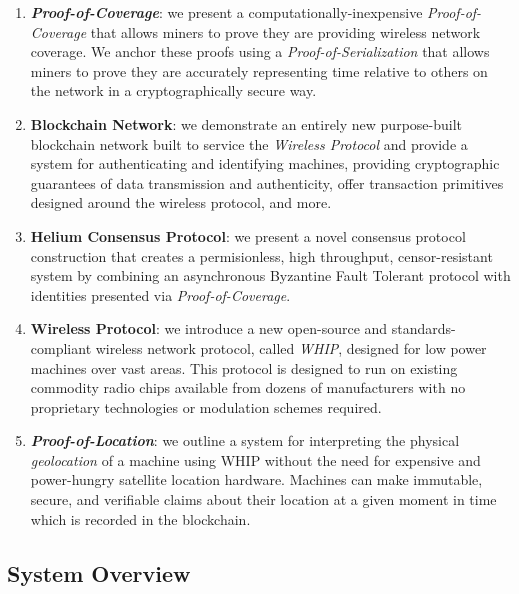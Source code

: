 \documentclass[10pt, nonatbib, nocopyrightspace, reprint]{sigplanconf}
\begin{document}
\begin{enumerate}
  \item \textbf{\emph{Proof-of-Coverage}}: we present a computationally-inexpensive \emph{Proof-of-Coverage} that allows miners to prove they are providing wireless network coverage. We anchor these proofs using a \emph{Proof-of-Serialization} that allows miners to prove they are accurately representing time relative to others on the network in a cryptographically secure way.

  \item \textbf{Blockchain Network}: we demonstrate an entirely new purpose-built blockchain network built to service the \emph{Wireless Protocol} and provide a system for authenticating and identifying machines, providing cryptographic guarantees of data transmission and authenticity, offer transaction primitives designed around the wireless protocol, and more.

  \item \textbf{Helium Consensus Protocol}: we present a novel consensus protocol construction that creates a permisionless, high throughput, censor-resistant system by combining an asynchronous Byzantine Fault Tolerant protocol with identities presented via \emph{Proof-of-Coverage}.

  \item \textbf{Wireless Protocol}: we introduce a new open-source and standards-compliant wireless network protocol, called \emph{WHIP}, designed for low power machines over vast areas. This protocol is designed to run on existing commodity radio chips available from dozens of manufacturers with no proprietary technologies or modulation schemes required.

  \item \textbf{\emph{Proof-of-Location}}: we outline a system for interpreting the physical \emph{geolocation} of a machine using WHIP without the need for expensive and power-hungry satellite location hardware. Machines can make immutable, secure, and verifiable claims about their location at a given moment in time which is recorded in the blockchain.
\end{enumerate}

\subsection{System Overview}
\end{document}
